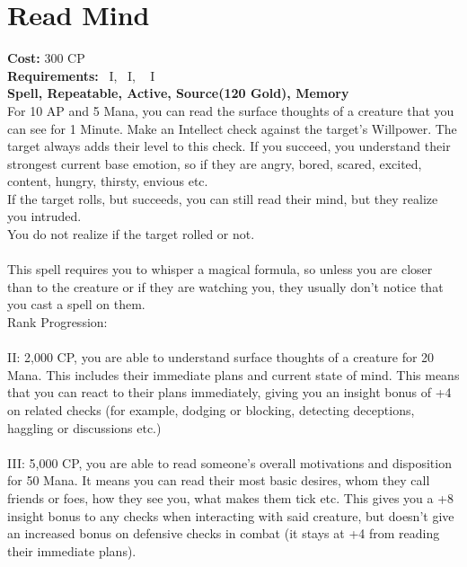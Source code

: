 \section{Read Mind}\label{spell:readMind}
\textbf{Cost:} 300 CP\\
\textbf{Requirements:}~ I,~ I, ~ I\\
\textbf{Spell, Repeatable, Active, Source(120 Gold), Memory}\\
For 10 AP and 5 Mana, you can read the surface thoughts of a creature that you can see for 1 Minute.
Make an Intellect check against the target's Willpower.
The target always adds their level to this check.
If you succeed, you understand their strongest current base emotion, so if they are angry, bored, scared, excited, content, hungry, thirsty, envious etc.\\
If the target rolls, but succeeds, you can still read their mind, but they realize you intruded.\\
You do not realize if the target rolled or not.\\
\\
This spell requires you to whisper a magical formula, so unless you are closer than  to the creature or if they are watching you, they usually don't notice that you cast a spell on them.
\\
Rank Progression:\\
\\
II: 2,000 CP, you are able to understand surface thoughts of a creature for 20 Mana.
This includes their immediate plans and current state of mind.
This means that you can react to their plans immediately, giving you an insight bonus of +4 on related checks (for example, dodging or blocking, detecting deceptions, haggling or discussions etc.)\\
\\
III: 5,000 CP, you are able to read someone's overall motivations and disposition for 50 Mana.
It means you can read their most basic desires, whom they call friends or foes, how they see you, what makes them tick etc.
This gives you a +8 insight bonus to any checks when interacting with said creature, but doesn't give an increased bonus on defensive checks in combat (it stays at +4 from reading their immediate plans).\\